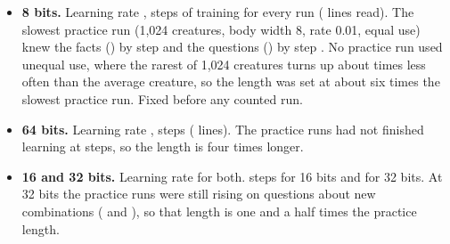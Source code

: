 \begin{itemize}
\item \textbf{8 bits.} Learning rate ,  steps of training for every
  run ( lines read). The slowest practice run (1,024 creatures, body width 8, rate
  0.01, equal use) knew the facts () by step 
  and the questions () by step . No
  practice run used unequal use, where the rarest of 1,024 creatures turns up about  times less
  often than the average creature, so the length was set at about six times the slowest practice
  run. Fixed before any counted run.
\item \textbf{64 bits.} Learning rate ,  steps (
  lines). The practice runs had not finished learning at 
  steps, so the length is four times longer.
\item \textbf{16 and 32 bits.} Learning rate  for both.  steps for 16 bits
  and  for 32 bits. At 32 bits the practice runs were still rising on questions
  about new combinations ( and
  ), so that length is one and a half times the practice length.
\end{itemize}
